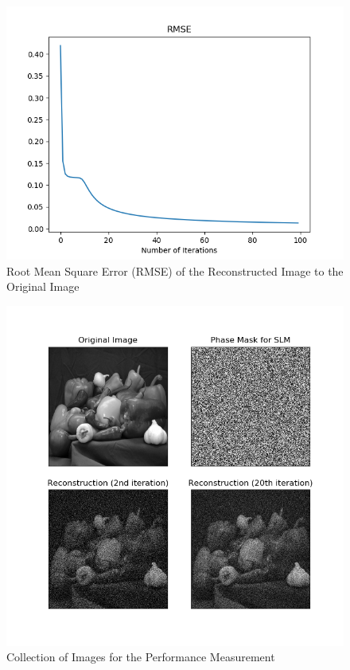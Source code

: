 \documentclass[12pt]{article}
\begin{document}
\begin{figure}
    \centering
    \includegraphics[width=\textwidth]{subroutine2.png}
    \caption{Root Mean Square Error (RMSE) of the Reconstructed Image to the Original Image}
    \label{fig:RMSE}
\end{figure}

\begin{figure}
    \centering
    \includegraphics[width=\textwidth]{Result.png}
    \caption{Collection of Images for the Performance Measurement}
    \label{fig:images_recon}
\end{figure}
\end{document}
